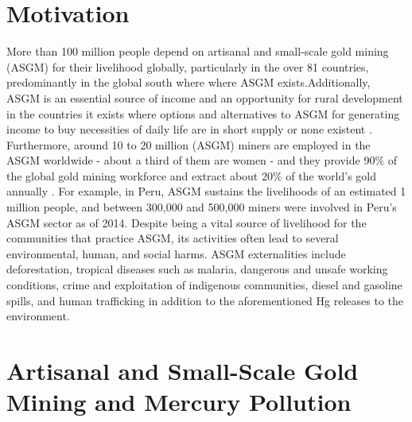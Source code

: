 \section{Motivation}
\begin{flushleft}
More than 100 million people depend on artisanal and small-scale gold mining (ASGM) for their livelihood globally, particularly in the over 81 countries, predominantly in the global south where where ASGM exists.Additionally, ASGM is an essential source of income and an opportunity for rural development in the countries it exists where options and alternatives to ASGM for generating income to buy necessities of daily life are in short supply or none existent \cite{planetgold_planetgold_2021}. Furthermore, around 10 to 20 million (ASGM) miners are employed in the ASGM worldwide - about a third of them are women - and they provide 90\% of the global gold mining workforce and extract about 20\% of the world’s gold annually \cite{planetgold_planetgold_2021}. For example, in Peru, ASGM sustains the livelihoods of an estimated 1 million people, and between 300,000 and 500,000 miners were involved in Peru’s ASGM sector as of 2014. Despite being a vital source of livelihood for the communities that practice ASGM, its activities often lead to several environmental, human, and social harms. ASGM externalities include deforestation, tropical diseases such as malaria, dangerous and unsafe working conditions, crime and exploitation of indigenous communities, diesel and gasoline spills, and human trafficking in addition to the aforementioned Hg releases to the environment\cite{usaid_usaid_2020}. 
\end{flushleft}

\section{Artisanal and Small-Scale Gold Mining and Mercury Pollution}


